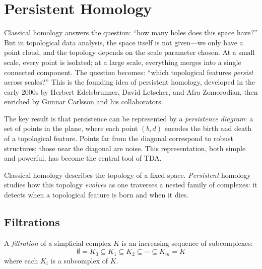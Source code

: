 \chapter{Persistent Homology}
\label{ch:persistent}

Classical homology answers the question: ``how many holes does this space have?'' But in topological data analysis, the space itself is not given---we only have a point cloud, and the topology depends on the scale parameter chosen. At a small scale, every point is isolated; at a large scale, everything merges into a single connected component. The question becomes: ``which topological features \emph{persist} across scales?'' This is the founding idea of persistent homology, developed in the early 2000s by Herbert Edelsbrunner, David Letscher, and Afra Zomorodian, then enriched by Gunnar Carlsson and his collaborators.

The key result is that persistence can be represented by a \emph{persistence diagram}: a set of points in the plane, where each point $(b, d)$ encodes the birth and death of a topological feature. Points far from the diagonal correspond to robust structures; those near the diagonal are noise. This representation, both simple and powerful, has become the central tool of TDA.

\begin{intuition}
Classical homology describes the topology of a fixed space. \emph{Persistent}
homology studies how this topology \emph{evolves} as one traverses a nested
family of complexes: it detects when a topological feature is born and
when it dies.
\end{intuition}

\section{Filtrations}

\begin{definition}
A \emph{filtration} of a simplicial complex $K$ is an increasing
sequence of subcomplexes:
\[
  \emptyset = K_0 \subseteq K_1 \subseteq K_2 \subseteq \cdots
  \subseteq K_m = K
\]
where each $K_i$ is a subcomplex of $K$.
\end{definition}

